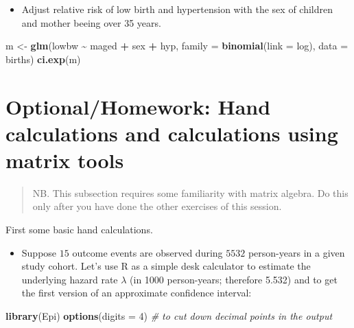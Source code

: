 \documentclass[
]{book}
\newenvironment{Shaded}{\begin{snugshade}}{\end{snugshade}}
\newcommand{\AttributeTok}[1]{\textcolor[rgb]{0.13,0.29,0.53}{#1}}
\newcommand{\CommentTok}[1]{\textcolor[rgb]{0.56,0.35,0.01}{\textit{#1}}}
\newcommand{\DecValTok}[1]{\textcolor[rgb]{0.00,0.00,0.81}{#1}}
\newcommand{\FunctionTok}[1]{\textcolor[rgb]{0.13,0.29,0.53}{\textbf{#1}}}
\newcommand{\NormalTok}[1]{#1}
\newcommand{\OtherTok}[1]{\textcolor[rgb]{0.56,0.35,0.01}{#1}}
\newcommand{\SpecialCharTok}[1]{\textcolor[rgb]{0.81,0.36,0.00}{\textbf{#1}}}
\providecommand{\tightlist}{%
  \setlength{\itemsep}{0pt}\setlength{\parskip}{0pt}}
\begin{document}
\begin{itemize}
\tightlist
\item
  Adjust relative risk of low birth and hypertension with the sex of children and mother beeing over 35 years.
\end{itemize}

\begin{Shaded}
\begin{Highlighting}[]
\NormalTok{m }\OtherTok{\textless{}{-}} \FunctionTok{glm}\NormalTok{(lowbw }\SpecialCharTok{\textasciitilde{}}\NormalTok{ maged }\SpecialCharTok{+}\NormalTok{ sex }\SpecialCharTok{+}\NormalTok{ hyp, }\AttributeTok{family =} \FunctionTok{binomial}\NormalTok{(}\AttributeTok{link =}\NormalTok{ log), }\AttributeTok{data =}\NormalTok{ births)}
\FunctionTok{ci.exp}\NormalTok{(m)}
\end{Highlighting}
\end{Shaded}

\section{Optional/Homework: Hand calculations and calculations using matrix tools}\label{optionalhomework-hand-calculations-and-calculations-using-matrix-tools}

\begin{quote}
NB. This subsection requires some familiarity with matrix algebra. Do this only after you have done the other exercises of this session.
\end{quote}

First some basic hand calculations.

\begin{itemize}
\tightlist
\item
  Suppose \(15\) outcome events are observed during \(5532\) person-years in a given study cohort.
  Let's use R as a simple desk calculator to estimate the underlying hazard rate \(\lambda\) (in 1000
  person-years; therefore 5.532) and to get the first version of an approximate confidence
  interval:
\end{itemize}

\begin{Shaded}
\begin{Highlighting}[]
\FunctionTok{library}\NormalTok{(Epi)}
\FunctionTok{options}\NormalTok{(}\AttributeTok{digits =} \DecValTok{4}\NormalTok{) }\CommentTok{\#  to cut down decimal points in the output}
\end{Highlighting}
\end{Shaded}
\end{document}
